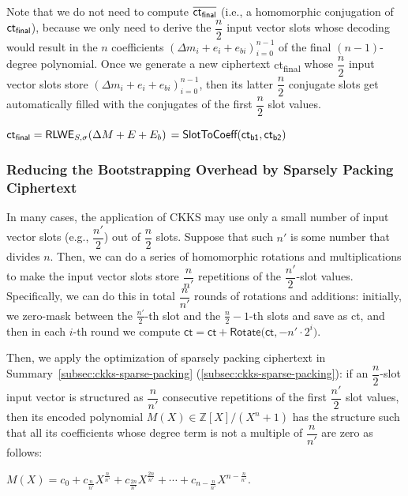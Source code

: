 Note that we do not need to compute $\overline{\textsf{ct\textsubscript{final}}}$ (i.e., a homomorphic conjugation of $\textsf{ct\textsubscript{final}}$), because we only need to derive the $\dfrac{n}{2}$ input vector slots whose decoding would result in the $n$ coefficients $(\Delta m_i + e_i + e_{bi})_{i=0}^{n-1}$ of the final $(n-1)$-degree polynomial. Once we generate a new ciphertext \textsf{ct\textsubscript{final}} whose $\dfrac{n}{2}$ input vector slots store $(\Delta m_i + e_i + e_{bi})_{i=0}^{n-1}$, then its latter $\dfrac{n}{2}$ conjugate slots get automatically filled with the conjugates of the first $\dfrac{n}{2}$ slot values.

$\textsf{ct\textsubscript{final}} = \textsf{RLWE}_{S, \sigma}(\Delta M + E + E_b)$ 
$= \textsf{SlotToCoeff}(\textsf{ct\textsubscript{b1}}, \textsf{ct\textsubscript{b2}})$

\subsubsection{Reducing the Bootstrapping Overhead by Sparsely Packing Ciphertext}
\label{subsubsec:ckks-bootstrapping-time-reduction}

In many cases, the application of CKKS may use only a small number of input vector slots (e.g., $\dfrac{n'}{2}$) out of $\dfrac{n}{2}$ slots. Suppose that such $n'$ is some number that divides $n$. Then, we can do a series of homomorphic rotations and multiplications to make the input vector slots store $\dfrac{n}{n'}$ repetitions of the $\dfrac{n'}{2}$-slot values. Specifically, we can do this in total $\dfrac{n}{n'}$ rounds of rotations and additions: initially, we zero-mask between the $\frac{n'}{2}$-th slot and the $\frac{n}{2} - 1$-th slots and save as \textsf{ct}, and then in each $i$-th round we compute $\textsf{ct} = \textsf{ct} +  \textsf{Rotate}\bm(\textsf{ct}, -n' \cdot 2^i\bm)$. 

Then, we apply the optimization of sparsely packing ciphertext in Summary~\ref{subsec:ckks-sparse-packing} (\autoref{subsec:ckks-sparse-packing}): if an $\dfrac{n}{2}$-slot input vector is structured as $\dfrac{n}{n'}$ consecutive repetitions of the first $\dfrac{n'}{2}$ slot values, then its encoded polynomial $M(X) \in \mathbb{Z}[X] / (X^{n} + 1)$ has the structure such that all its coefficients whose degree term is not a multiple of $\dfrac{n}{n'}$ are zero as follows:

$M(X) = c_0 + c_{\frac{n}{n'}}X^{\frac{n}{n'}} + c_{\frac{2n}{n'}}X^{\frac{2n}{n'}} + \cdots + c_{n - \frac{n}{n'}}X^{n - \frac{n}{n'}}$. 

